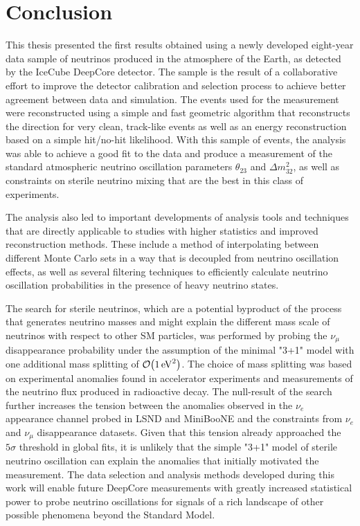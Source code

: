 \chapter{Conclusion}

This thesis presented the first results obtained using a newly developed eight-year data sample of neutrinos produced in the atmosphere of the Earth, as detected by the IceCube DeepCore detector.
The sample is the result of a collaborative effort to improve the detector calibration and selection process to achieve better agreement between data and simulation.
The events used for the measurement were reconstructed using a simple and fast geometric algorithm that reconstructs the direction for very clean, track-like events as well as an energy reconstruction based on a simple hit/no-hit likelihood.
With this sample of events, the analysis was able to achieve a good fit to the data and produce a measurement of the standard atmospheric neutrino oscillation parameters $\theta_{23}$ and $\Delta m^2_{32}$, as well as constraints on sterile neutrino mixing that are the best in this class of experiments.

The analysis also led to important developments of analysis tools and techniques that are directly applicable to studies with higher statistics and improved reconstruction methods.
These include a method of interpolating between different Monte Carlo sets in a way that is decoupled from neutrino oscillation effects, as well as several filtering techniques to efficiently calculate neutrino oscillation probabilities in the presence of heavy neutrino states.

The search for sterile neutrinos, which are a potential byproduct of the process that generates neutrino masses and might explain the different mass scale of neutrinos with respect to other SM particles, was performed by probing the $\nu_\mu$ disappearance probability under the assumption of the minimal "3+1" model with one additional mass splitting of $\order{\SI{1}{\electronvolt\squared}}$.
The choice of mass splitting was based on experimental anomalies found in accelerator experiments and measurements of the neutrino flux produced in radioactive decay.
The null-result of the search further increases the tension between the anomalies observed in the $\nu_e$ appearance channel probed in LSND and MiniBooNE and the constraints from $\nu_e$ and $\nu_\mu$ disappearance datasets.
Given that this tension already approached the $5\sigma$ threshold in global fits, it is unlikely that the simple "3+1" model of sterile neutrino oscillation can explain the anomalies that initially motivated the measurement.
The data selection and analysis methods developed during this work will enable future DeepCore measurements with greatly increased statistical power to probe neutrino oscillations for signals of a rich landscape of other possible phenomena beyond the Standard Model.
